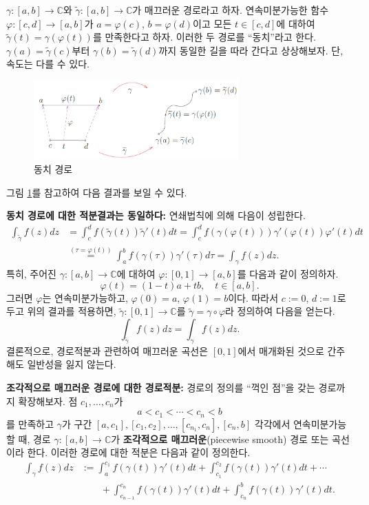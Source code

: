 $\gamma:[a,b] \to \mathbb C$와  $\tilde\gamma:[a,b] \to \mathbb C$가
매끄러운 경로라고 하자.
연속미분가능한 함수 $\varphi:[c,d] \to [a,b]$가
$a=\varphi(c)$, $b=\varphi(d)$이고 모든 $t\in[c,d]$에 대하여
$\tilde\gamma(t) = \gamma(\varphi(t))$를 만족한다고 하자.
이러한 두 경로를 ``동치''라고 한다.
$\gamma(a) = \tilde\gamma(c)$부터 $\gamma(b) = \tilde\gamma(d)$까지
동일한 길을 따라 간다고 상상해보자. 단, 속도는 다를 수 있다.
\begin{figure}[!h]
\begin{center}
\includegraphics[width=0.7\textwidth]{./SaltChapter/figs/fig-3-5}
\end{center}
\caption{동치 경로}
\label{fig-3-5}
\end{figure}

그림 \ref{fig-3-5}를 참고하여
다음 결과를 보일 수 있다.


{\bf 동치 경로에 대한 적분결과는 동일하다:}
연쇄법칙에 의해 다음이 성립한다.
\begin{align*}
\int_{\tilde\gamma}f(z)dz
&= \int_c^d f(\tilde\gamma(t))\tilde\gamma'(t)dt
= \int_c^d f(\gamma(\varphi(t)))\gamma'(\varphi(t)) \varphi'(t)dt \\
&\stackrel{(\tau=\varphi(t))}=
\int_a^b f(\gamma(\tau))\gamma'(\tau)d\tau
= \int_{\gamma}f(z)dz.
\end{align*}
특히, 주어진 $\gamma:[a,b]\to\mathbb C$에 대하여
$\varphi: [0,1]\to [a,b]$를 다음과 같이 정의하자.
\[
\varphi(t) = (1-t)a + tb, \quad t\in [a,b].
\]
그러면 $\varphi$는 연속미분가능하고,
$\varphi(0)=a$, $\varphi(1)=b$이다.
따라서 $c:=0$, $d:=1$로 두고 위의 결과를 적용하면,
$\tilde\gamma : [0,1]\to\mathbb C$를
$\tilde\gamma = \gamma\circ\varphi$라 정의하여
다음을 얻는다.
\[
\int_{\tilde\gamma} f(z)dz = \int_\gamma f(z)dz.
\]
결론적으로, 경로적분과 관련하여
매끄러운 곡선은 $[0,1]$에서 매개화된 것으로 간주해도 일반성을 잃지 않는다.

{\bf 조각적으로 매끄러운 경로에 대한 경로적분:}
경로의 정의를 ``꺽인 점''을 갖는 경로까지 확장해보자.
점 $c_1, \ldots, c_n$가
\[
a<c_1 < \cdots <c_n <b
\]
를 만족하고 $\gamma$가 구간 $[a,c_1], [c_1,c_2], \ldots, [c_{n_1}, c_n], [c_n,b]$ 각각에서
연속미분가능할 때,
경로 $\gamma:[a,b]\to\mathbb C$가 {\bf 조각적으로 매끄러운}(piecewise smooth) 경로 또는 곡선이라 한다.
이러한 경로에 대한 적분은 다음과 같이 정의한다.
\begin{align*}
\int_\gamma f(z)dz
&:= \int_a^{c_1} f(\gamma(t))\gamma'(t)dt + \int_{c_1}^{c_2} f(\gamma(t))\gamma'(t)dt
+ \cdots \\
&\quad \quad + \int_{c_{n-1}}^{c_n} f(\gamma(t))\gamma'(t)dt 
+ \int_{c_n}^b f(\gamma(t))\gamma'(t)dt.
\end{align*}

